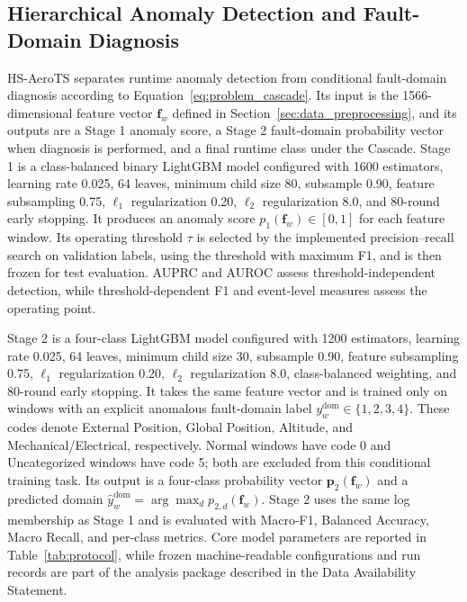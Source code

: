 \subsection{Hierarchical Anomaly Detection and Fault-Domain Diagnosis}
\label{sec:hierarchical_diagnosis}

HS-AeroTS separates runtime anomaly detection from conditional fault-domain diagnosis according to Equation~\eqref{eq:problem_cascade}. Its input is the 1566-dimensional feature vector $\mathbf{f}_w$ defined in Section~\ref{sec:data_preprocessing}, and its outputs are a Stage 1 anomaly score, a Stage 2 fault-domain probability vector when diagnosis is performed, and a final runtime class under the Cascade. Stage 1 is a class-balanced binary LightGBM model configured with 1600 estimators, learning rate 0.025, 64 leaves, minimum child size 80, subsample 0.90, feature subsampling 0.75, $\ell_1$ regularization 0.20, $\ell_2$ regularization 8.0, and 80-round early stopping. It produces an anomaly score $p_1(\mathbf{f}_w)\in[0,1]$ for each feature window. Its operating threshold $\tau$ is selected by the implemented precision--recall search on validation labels, using the threshold with maximum F1, and is then frozen for test evaluation. AUPRC and AUROC assess threshold-independent detection, while threshold-dependent F1 and event-level measures assess the operating point.

Stage 2 is a four-class LightGBM model configured with 1200 estimators, learning rate 0.025, 64 leaves, minimum child size 30, subsample 0.90, feature subsampling 0.75, $\ell_1$ regularization 0.20, $\ell_2$ regularization 8.0, class-balanced weighting, and 80-round early stopping. It takes the same feature vector and is trained only on windows with an explicit anomalous fault-domain label $y_w^{\mathrm{dom}}\in\{1,2,3,4\}$. These codes denote External Position, Global Position, Altitude, and Mechanical/Electrical, respectively. Normal windows have code 0 and Uncategorized windows have code 5; both are excluded from this conditional training task. Its output is a four-class probability vector $\mathbf{p}_2(\mathbf{f}_w)$ and a predicted domain $\hat{y}_w^{\mathrm{dom}}=\arg\max_d p_{2,d}(\mathbf{f}_w)$. Stage 2 uses the same log membership as Stage 1 and is evaluated with Macro-F1, Balanced Accuracy, Macro Recall, and per-class metrics. Core model parameters are reported in Table~\ref{tab:protocol}, while frozen machine-readable configurations and run records are part of the analysis package described in the Data Availability Statement.

